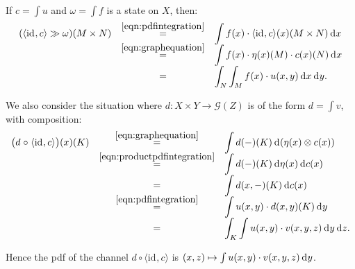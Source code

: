 \documentclass{mscs}
\newcommand{\after}{\mathrel{\circ}}
\newcommand{\idmap}[1][]{\ensuremath{\mathrm{id}_{#1}}}
\newcommand{\Giry}{\mathcal{G}}
\newcommand{\tuple}[1]{\langle#1\rangle}
\newcommand{\intd}{{\kern.2em}\mathrm{d}{\kern.03em}}
\begin{document}
\noindent If $c = \int u$ and $\omega = \int f$ is a state on $X$, then:
\begin{equation}
\label{eqn:pdfgraphstatetransformation}
\begin{array}{rcl}
(\tuple{\idmap,c} \gg \omega)(M\times N)
& \smash{\stackrel{\eqref{eqn:pdfintegration}}{=}} &
\displaystyle \int f(x) \cdot \tuple{\idmap,c}(x)(M\times N) \intd x
\\
& \smash{\stackrel{\eqref{eqn:graphequation}}{=}} &
\displaystyle \int f(x) \cdot \eta(x)(M) \cdot c(x)(N) \intd x
\\
& = &
\displaystyle \int_{N} \int_{M} f(x) \cdot u(x,y) \intd x \intd y.
\end{array}
\end{equation}

\noindent We also consider the situation where $d\colon X\times Y
\rightarrow \Giry(Z)$ is of the form $d = \int v$, with composition:
\begin{equation}
\label{eqn:pdfgraphcomposition}
\begin{array}{rcl}
\big(d \after \tuple{\idmap,c}\big)(x)(K)
& \smash{\stackrel{\eqref{eqn:graphequation}}{=}} &
\displaystyle \int d(-)(K) \intd (\eta(x)\otimes c(x))
\\
& \smash{\stackrel{\eqref{eqn:productpdfintegration}}{=}} &
\displaystyle \int d(-)(K) \intd \eta(x) \intd c(x)
\\
& = &
\displaystyle \int d(x,-)(K) \intd c(x)
\\
& \smash{\stackrel{\eqref{eqn:pdfintegration}}{=}} &
\displaystyle \int u(x,y) \cdot d(x,y)(K) \intd y
\\
& = &
\displaystyle \int_{K} \int u(x,y) \cdot v(x,y,z) \intd y \intd z.
\end{array}
\end{equation}

\noindent Hence the pdf of the channel $d \after \tuple{\idmap,c}$
is $(x,z) \mapsto \int u(x,y) \cdot v(x,y,z) \intd y$.


%
\end{document}
